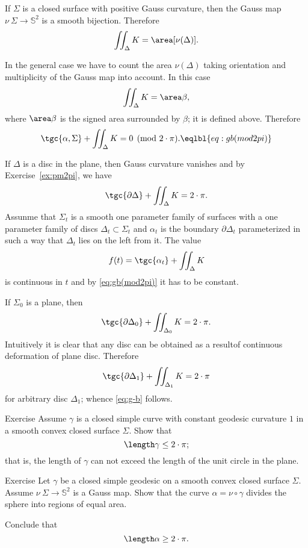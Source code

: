If $\Sigma$ is a closed surface with positive Gauss curvature, then the Gauss map $\nu\:\Sigma\to\mathbb{S}^2$ is a smooth bijection.
Therefore 
\[\iint_\Delta K=\area[\nu(\Delta)].\]

In the general case we have to count the area $\nu(\Delta)$ taking orientation and multiplicity of the Gauss map into account.
In this case 
\[\iint_\Delta K=\area\beta,\]
where $\area\beta$ is the signed area surrounded by $\beta$; it is defined above.
Therefore 
\[\tgc{\alpha,\Sigma}+\iint_\Delta K=0\pmod{2\cdot \pi}.\eqlbl{eq:gb(mod2pi)}\]

If $\Delta$ is a disc in the plane, then Gauss curvature vanishes and by Exercise~\ref{ex:pm2pi}, we have 
\[\tgc{\partial\Delta}+\iint_\Delta K=2\cdot \pi.\]
Assunme that $\Sigma_t$ is a smooth one parameter family of surfaces with 
a one parameter family of discs $\Delta_t\subset \Sigma_t$ and $\alpha_t$ is the boundary $\partial\Delta_t$ parameterized in such a way that $\Delta_t$ lies on the left from it.
The value 
\[f(t)=\tgc{\alpha_t}+\iint_\Delta K\]
is continuous in $t$ and by \ref{eq:gb(mod2pi)} it has to be constant.

If $\Sigma_0$ is a plane, then 
\[\tgc{\partial\Delta_0}+\iint_{\Delta_0} K=2\cdot \pi.\]
Intuitively it is clear that any disc can be obtained as a resultof continuous deformation of plane disc.
Therefore 
\[\tgc{\partial\Delta_1}+\iint_{\Delta_1} K=2\cdot \pi\]
for arbitrary disc $\Delta_1$; whence \ref{eq:g-b} follows.
\qeds





\begin{thm}{Exercise}
 Assume $\gamma$ is a closed simple curve with constant geodesic curvature $1$ in a smooth convex closed surface $\Sigma$.
 Show that 
 \[\length\gamma\le 2\cdot\pi;\]
that is, the length of $\gamma$ can not exceed the length of the unit circle in the plane.  
\end{thm}


\begin{thm}{Exercise}
Let $\gamma$ be a closed simple geodesic on a smooth convex closed surface $\Sigma$.
Assume $\nu\:\Sigma\to\mathbb{S}^2$ is a Gauss map.
Show that the curve $\alpha=\nu\circ\gamma$ divides the sphere into regions of equal area.

Conclude that
\[\length \alpha\ge 2\cdot\pi.\]
\end{thm}

